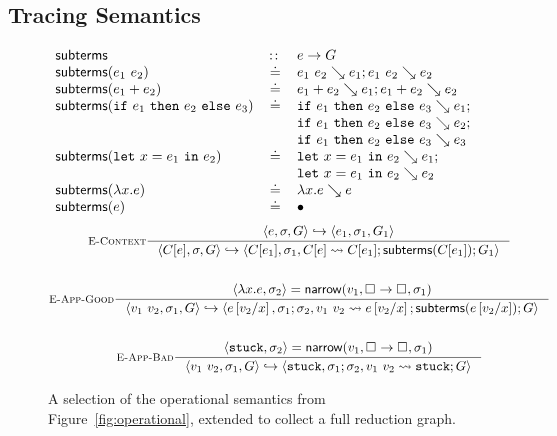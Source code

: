\subsection{Tracing Semantics}
\label{sec:inter-semant}
%
\begin{figure*}[t]
\begin{gather*}
\begin{array}{lcl}
\mathsf{subterms}                 & \colon\!\!\colon & e \to G \\
\mathsf{subterms}(e_1 \ e_2)   & \doteq & e_1 \ e_2 \searrow e_1; e_1 \ e_2 \searrow e_2 \\
\mathsf{subterms}(e_1 + e_2)   & \doteq & e_1 + e_2 \searrow e_1; e_1 + e_2 \searrow e_2 \\
\mathsf{subterms}(\mathtt{if}\ e_1\ \mathtt{then}\ e_2\ \mathtt{else}\ e_3)   & \doteq & \mathtt{if}\ e_1\ \mathtt{then}\ e_2\ \mathtt{else}\ e_3 \searrow e_1; \\
                                &        & \mathtt{if}\ e_1\ \mathtt{then}\ e_2\ \mathtt{else}\ e_3 \searrow e_2; \\
                                &        & \mathtt{if}\ e_1\ \mathtt{then}\ e_2\ \mathtt{else}\ e_3 \searrow e_3 \\
\mathsf{subterms}(\mathtt{let}\ x = e_1\ \mathtt{in}\ e_2)   & \doteq & \mathtt{let}\ x = e_1\ \mathtt{in}\ e_2 \searrow e_1; \\
                                &        & \mathtt{let}\ x = e_1\ \mathtt{in}\ e_2 \searrow e_2 \\
\mathsf{subterms}(\lambda x. e)       & \doteq & \lambda x. e \searrow e \\
\mathsf{subterms}(e)                 & \doteq & \bullet
\end{array}
\end{gather*}
\begin{gather*}
\inference[\recontext]
  {\stepg{e}{\su}{\tr}{e_1}{\su_1}{\tr_1}}
  {\stepg{C[e]}{\su}{\tr}{C[e_1]}{\su_1}{\singlestep{C[e]}{C[e_1]}; \subterms{C[e_1]}; \tr_1}}
\\ \\
\inference[\reappgood]
  {\pair{\efun{x}{e}}{\su_2} = \force{v_1}{\tfun{\thole{}}{\thole{}}}{\su_1}}
  {\stepg{\eapp{v_1}{v_2}}{\su_1}{\tr}
         {e\sub{x}{v_2}}{\su_1;\su_2}{\singlestep{\eapp{v_1}{v_2}}{e\sub{x}{v_2}}; \subterms{e\sub{x}{v_2}}; \tr}}
\\ \\
\inference[\reappbad]
  {\pair{\stuck}{\su_2} = \force{v_1}{\tfun{\thole{}}{\thole{}}}{\su_1}}
  {\stepg{\eapp{v_1}{v_2}}{\su_1}{\tr}{\stuck}{\su_1;\su_2}{\singlestep{\eapp{v_1}{v_2}}{\stuck}; \tr}}
\end{gather*}
\caption{A selection of the operational semantics from
  Figure~\ref{fig:operational}, extended to collect a full reduction
  graph.}
\label{fig:interactive}
\end{figure*}

